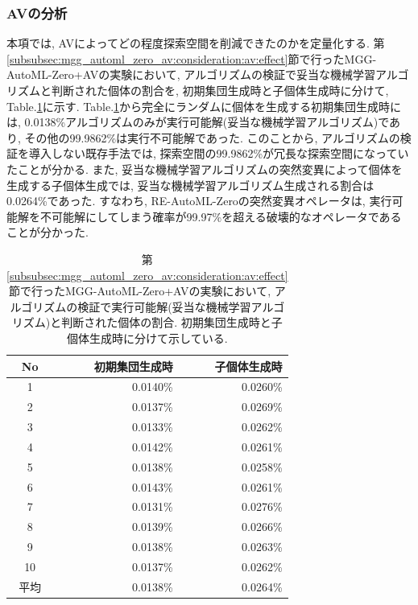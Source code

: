 \documentclass[11pt,oneside,openany,report]{jsbook}
\begin{document}
\subsubsection{AVの分析}\label{subsubsec:mgg_automl_zero_av:consideration:av:analysis}

本項では, AVによってどの程度探索空間を削減できたのかを定量化する. 第\ref{subsubsec:mgg_automl_zero_av:consideration:av:effect}節で行ったMGG-AutoML-Zero+AVの実験において, アルゴリズムの検証で妥当な機械学習アルゴリズムと判断された個体の割合を, 初期集団生成時と子個体生成時に分けて, Table.\ref{table:av_validation_rate}に示す. Table.\ref{table:av_validation_rate}から完全にランダムに個体を生成する初期集団生成時には, 0.0138\%アルゴリズムのみが実行可能解(妥当な機械学習アルゴリズム)であり, その他の99.9862\%は実行不可能解であった. このことから, アルゴリズムの検証を導入しない既存手法では, 探索空間の99.9862\%が冗長な探索空間になっていたことが分かる. また, 妥当な機械学習アルゴリズムの突然変異によって個体を生成する子個体生成では, 妥当な機械学習アルゴリズム生成される割合は0.0264\%であった. すなわち, RE-AutoML-Zeroの突然変異オペレータは, 実行可能解を不可能解にしてしまう確率が99.97\%を超える破壊的なオペレータであることが分かった.

\begin{table}[tbp]
  \caption{第\ref{subsubsec:mgg_automl_zero_av:consideration:av:effect}節で行ったMGG-AutoML-Zero+AVの実験において, アルゴリズムの検証で実行可能解(妥当な機械学習アルゴリズム)と判断された個体の割合. 初期集団生成時と子個体生成時に分けて示している. }
  \label{table:av_validation_rate}
  \centering
  \begin{tabular}{|c|r|r|}
    \hline
    No & 初期集団生成時  & 子個体生成時   \\
    \hline \hline
    1  & 0.0140\% & 0.0260\% \\
    2  & 0.0137\% & 0.0269\% \\
    3  & 0.0133\% & 0.0262\% \\
    4  & 0.0142\% & 0.0261\% \\
    5  & 0.0138\% & 0.0258\% \\
    6  & 0.0143\% & 0.0261\% \\
    7  & 0.0131\% & 0.0276\% \\
    8  & 0.0139\% & 0.0266\% \\
    9  & 0.0138\% & 0.0263\% \\
    10 & 0.0137\% & 0.0262\% \\
    \hline
    平均 & 0.0138\% & 0.0264\% \\
    \hline
  \end{tabular}
\end{table}
\end{document}
